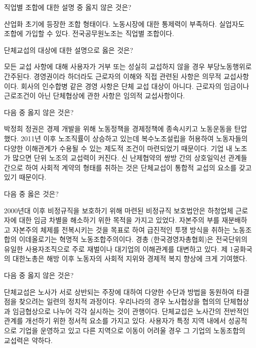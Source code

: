 \documentclass[11pt,answers]{exam} %
\begin{document}
\begin{questions}
\question[2] 직업별 조합에 대한 설명 중 옳지 않은 것은?
    \begin{choices}
    \choice\relax 산업화 초기에 등장한 조합 형태이다.
    \CorrectChoice\relax 노동시장에 대한 통제력이 부족하다.
    \choice\relax 실업자도 조합에 가입할 수 있다.
    \choice\relax 전국공무원노조는 직업별 조합이다.
    \end{choices}

\question[2] 단체교섭의 대상에 대한 설명으로 옳은 것은?
    \begin{choices}
    \choice\relax 모든 교섭 사항에 대해 사용자가 거부 또는 성실히 교섭하지 않을 경우 부당노동행위로 간주된다.
    \CorrectChoice\relax 경영권이라 하더라도 근로자의 이해와 직접 관련된 사항은 의무적 교섭사항이다.
    \choice\relax 회사의 인수합병 같은 경영 사항은 단체 교섭 대상이 아니다.
    \choice\relax 근로자의 임금이나 근로조건이 아닌 단체협상에 관한 사항은 임의적 교섭사항이다.
    \end{choices}

\question[2] 다음 중 옳지 않은 것은?
    \begin{choices}
    \choice\relax 박정희 정권은 경제 개발을 위해 노동정책을 경제정책에 종속시키고 노동운동을 탄압했다.
    \choice\relax 2011년 이후 노조직률이 상승하고 있는데 복수노조설립을 허용하여 노동자들의 다양한 이해관계가 수용될 수 있는 제도적 조건이 마련되었기 때문이다.
    \CorrectChoice\relax 기업 내 노조가 많으면 단위 노조의 교섭력이 커진다.
    \choice\relax 신 난제협약의 쌍방 간의 상호일익선 관계들 간으로 하여 사회적 계약의 형태를 취하는 것은 단체교섭이 통합적 교섭의 요소를 갖고 있기 때문이다.
    \end{choices}

\question[2] 다음 중 옳은 것은?
    \begin{choices}
    \choice\relax 2000년대 이후 비정규직을 보호하기 위해 마련된 비정규직 보호법안은 하청업체 근로자에 대한 임금 차별을 해소하기 위한 목적을 가지고 있었다.
    \CorrectChoice\relax 자본주의 부를 재분배하고 자본주의 체제를 전복시키는 것을 목표로 하여 급진적인 투쟁 방식을 취하는 노동조합의 이데올로기는 혁명적 노동조합주의이다.
    \choice\relax 경총 (한국경영자총협회)은 전국단위의 유일한 사용자조직으로 주로 재벌이나 대기업의 이해관계를 대변하고 있다.
    \choice\relax 제 1공화국의 대한노총은 해방 이후 노동자의 사회적 지위와 경제적 복지 향상에 크게 기여했다.
    \end{choices}

\question[2] 다음 중 옳지 않은 것은?
    \begin{choices}
    \choice\relax 단체교섭은 노사가 서로 상반되는 주장에 대하여 다양한 수단과 방법을 동원하여 타결점을 찾으려는 일련의 정치적 과정이다.
    \choice\relax 우리나라의 경우 노사협상을 협의의 단체협상과 임금협상으로 나누어 각각 실시하는 것이 관행이다.
    \choice\relax 단체교섭은 노사간의 전반적인 관계를 개선하기 위한 정서적 요소를 가지고 있다.
    \CorrectChoice\relax 사용자가 특정 지역 내에서 성공적으로 기업을 운영하고 있고 다른 지역으로 이동이 어려울 경우 그 기업의 노동조합의 교섭력은 약하다.
    \end{choices}


\end{questions}
\end{document}
